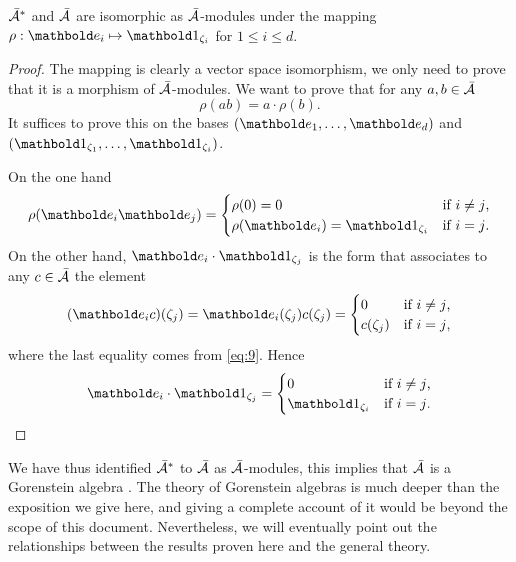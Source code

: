 \begin{proposition}
  \label{th:gorenstein}
  $\bar{\mathcal{A}}^\ast$ and $\bar{\mathcal{A}}$ are isomorphic as
  $\bar{\mathcal{A}}$-modules under the mapping
  $\rho:\basis{e}_i\mapsto\basis{1}_{\zeta_i}$ for $1\le i\le d$.
\end{proposition}
\begin{proof}
  The mapping is clearly a vector space isomorphism, we only need to
  prove that it is a morphism of $\bar{\mathcal{A}}$-modules. We want
  to prove that for any $a,b\in\bar{\mathcal{A}}$
  \[\rho(ab) = a\cdot\rho(b)\text{.}\]
  It suffices to prove this on the bases
  $(\basis{e}_1,\ldots,\basis{e}_d)$ and
  $(\basis{1}_{\zeta_1},\ldots,\basis{1}_{\zeta_i})$.

  On the one hand
  \begin{equation}
    \label{eq:12}
    \rho(\basis{e}_i\basis{e}_j)=
    \begin{cases}
      \rho(0)=0 &\text{if $i\ne j$,}\\
      \rho(\basis{e}_i)=\basis{1}_{\zeta_i} &\text{if $i=j$.}
    \end{cases}
  \end{equation}
  On the other hand, $\basis{e_i}\cdot\basis{1_{\zeta_j}}$ is the form
  that associates to any $c\in\bar{\mathcal{A}}$ the element
  \begin{equation}
    \label{eq:13}
    (\basis{e_i}c)(\zeta_j) = \basis{e}_i(\zeta_j)c(\zeta_j) = 
    \begin{cases}
      0 &\text{if $i\ne j$,}\\
      c(\zeta_j) &\text{if $i=j$,}
    \end{cases}
  \end{equation}
  where the last equality comes from \eqref{eq:9}. Hence
  \begin{equation}
    \label{eq:14}
    \basis{e}_i\cdot\basis{1}_{\zeta_j}=
    \begin{cases}
      0 &\text{if $i\ne j$,}\\
      \basis{1}_{\zeta_i} &\text{if $i=j$.}
    \end{cases}
  \end{equation}
\end{proof}

\begin{nota}
  We have thus identified $\bar{\mathcal{A}}^\ast$ to
  $\bar{\mathcal{A}}$ as $\bar{\mathcal{A}}$-modules, this implies that
  $\bar{\mathcal{A}}$ is a Gorenstein algebra \cite[Chapter
  8]{mourrain+elkadi}. The theory of Gorenstein algebras is much
  deeper than the exposition we give here, and giving a complete
  account of it would be beyond the scope of this
  document. Nevertheless, we will eventually point out the
  relationships between the results proven here and the general
  theory.
\end{nota}

